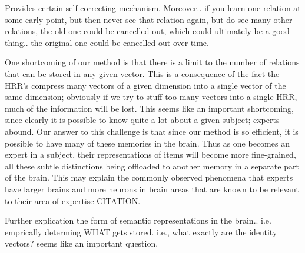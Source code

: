 \documentclass[10pt,letterpaper]{article}
\begin{document}
Provides certain self-correcting mechanism.
Moreover.. if you learn one relation at some early point, but then never see that relation again, but do see many other relations, the old one could be cancelled out, which could ultimately be a good thing.. the original one could be cancelled out over time.

One shortcoming of our method is that there is a limit to the number of relations that can be stored in any given vector. This is a consequence of the fact the HRR's compress many vectors of a given dimension into a single vector of the same dimension; obviously if we try to stuff too many vectors into a single HRR, much of the information will be lost. This seems like an important shortcoming, since clearly it is possible to know quite a lot about a given subject; experts abound. Our answer to this challenge is that since our method is so efficient, it is possible to have many of these memories in the brain. Thus as one becomes an expert in a subject, their representations of items will become more fine-grained, all these subtle distinctions being offloaded to another memory in a separate part of the brain. This may explain the commonly observed phenomena that experts have larger brains and more neurons in brain areas that are known to be relevant to their area of expertise CITATION.

Further explication the form of semantic representations in the brain.. i.e. emprically determing WHAT gets stored. i.e., what exactly are the identity vectors? seems like an important question.


\end{document}
